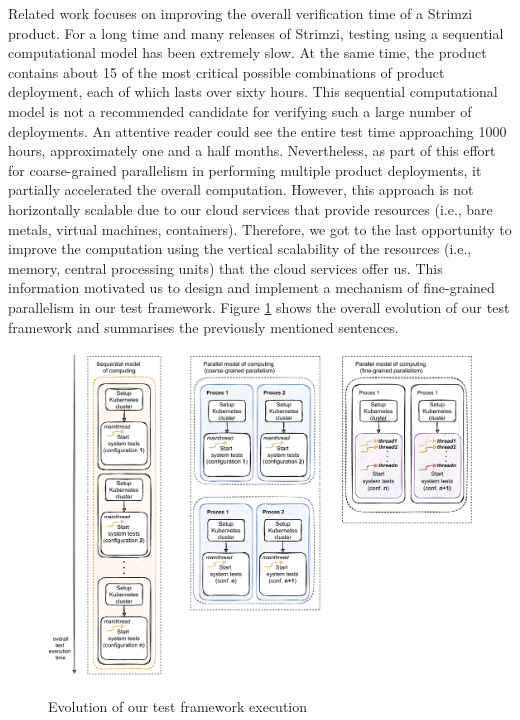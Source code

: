 Related work focuses on improving the overall verification time of a Strimzi product.
For a long time and many releases of Strimzi, testing using a sequential computational model has been extremely slow.
At the same time, the product contains about 15 of the most critical possible combinations of product deployment, each of which lasts over sixty hours.
This sequential computational model is not a recommended candidate for verifying such a large number of deployments.
An attentive reader could see the entire test time approaching 1000 hours, approximately one and a half months.
Nevertheless, as part of this effort for coarse-grained parallelism in performing multiple product deployments, it partially accelerated the overall computation.
However, this approach is not horizontally scalable due to our cloud services that provide resources (i.e., bare metals, virtual machines, containers).
Therefore, we got to the last opportunity to improve the computation using the vertical scalability of the resources (i.e., memory, central processing units) that the cloud services offer us.
This information motivated us to design and implement a mechanism of fine-grained parallelism in our test framework.
Figure \ref{00:fig:evolution} shows the overall evolution of our test framework and summarises the previously mentioned sentences.

\begin{figure}[!ht]
    \centering
    \includegraphics[scale=0.7]{obrazky-figures/01-intro/00-intro-better-one}
    \label{00:fig:evolution}
    \caption{Evolution of our test framework execution}
\end{figure}

